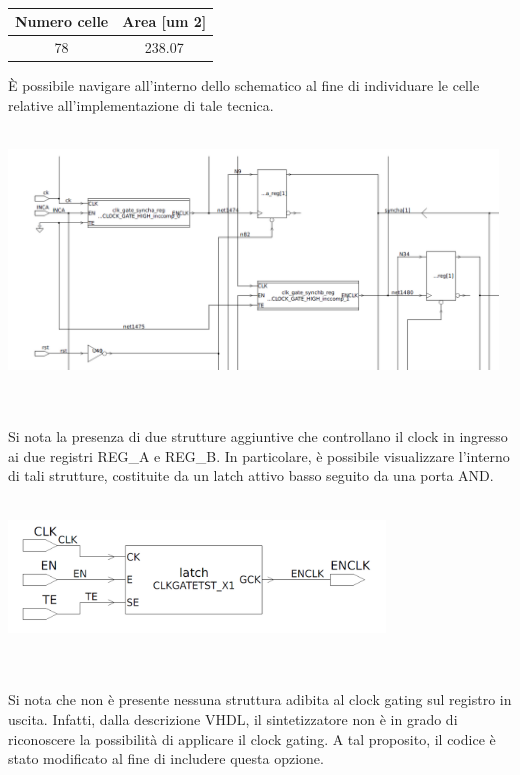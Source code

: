 \documentclass[11pt,  english, makeidx, a4paper, titlepage, oneside]{book}
\newenvironment{listato}{\footnotesize} {\normalsize }
\begin{document}
\\
\begin{center}
	\begin{tabular}{|c|c|}
	\hline
	Numero celle & Area [um 2] \\
	\hline
	 78 & 238.07 \\
	\hline
	\end{tabular}	
\end{center}
\vspace{0.3cm}          
È possibile navigare all'interno dello schematico al fine di individuare le celle relative all'implementazione di tale tecnica.        
\\\\
\centerline{\includegraphics[width=13cm]{./img/Lab_3/clock_gating_cells.png}}
\\\\
Si nota la presenza di due strutture aggiuntive che controllano il clock in ingresso ai due registri REG\_A e REG\_B. In particolare, è possibile visualizzare l'interno di tali strutture, costituite da un latch attivo basso seguito da una porta AND.
\\\\
\centerline{\includegraphics[width=10cm]{./img/Lab_3/clock_gating_implementation.png}}
\\\\       
Si nota che non è presente nessuna struttura adibita al clock gating sul registro in uscita. Infatti, dalla descrizione VHDL, il sintetizzatore non è in grado di riconoscere la possibilità di applicare il clock gating. A tal proposito, il codice è stato modificato al fine di includere questa opzione.
\begin{center}
\begin{listato}
	\centerline{}
\end{listato}
\end{center}
\end{document}
